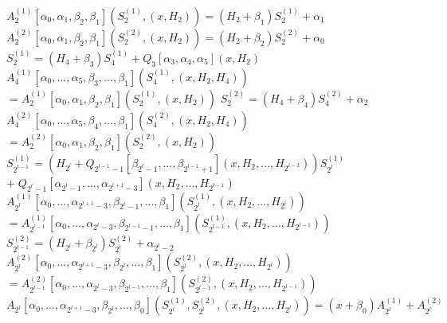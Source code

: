 \begin{algorithm}[H]
    \caption{High-level fill construction}\label{alg:constr-fill}
    \begin{algorithmic}
            \Statex $A^{(1)}_{2}[\alpha_0, \alpha_1, \beta_2, \beta_1](S^{(1)}_2, (x, H_2)) = (H_2 + \beta_1) S^{(1)}_2 + \alpha_1$
            \Statex $A^{(2)}_{2}[\alpha_0, \alpha_1, \beta_2, \beta_1](S^{(2)}_2, (x, H_2)) = (H_2 + \beta_2) S^{(2)}_2 + \alpha_0$
            \Statex $S^{(1)}_{2} = (H_{4} + \beta_3) S^{(1)}_{4} + Q_{3}[\alpha_3, \alpha_4, \alpha_5](x, H_2)$
            \Statex $A^{(1)}_{4}[\alpha_0, \ldots, \alpha_5, \beta_3, \ldots, \beta_1](S^{(1)}_{4}, (x, H_2, H_4))$
            \Statex \hspace{\algorithmicindent}$= A^{(1)}_{2}[\alpha_0, \alpha_1, \beta_2, \beta_1](S^{(1)}_{2}, (x, H_2))$
            \Statex $S^{(2)}_{2} = (H_{4} + \beta_4) S^{(2)}_{4} + \alpha_2$
            \Statex $A^{(2)}_{4}[\alpha_0, \ldots, \alpha_5, \beta_4, \ldots, \beta_1](S^{(2)}_{4}, (x, H_2, H_{4}))$
            \Statex \hspace{\algorithmicindent}$= A^{(2)}_{2}[\alpha_0, \alpha_1, \beta_2, \beta_1](S^{(2)}_{2}, (x, H_2))$
        \Else
            \Statex $S^{(1)}_{2^{l - 1}} = (H_{2^{l}} + Q_{2^{l - 1} - 1}[\beta_{2^{l} - 1}, \ldots, \beta_{2^{l - 1} + 1}](x, H_2, \ldots, H_{2^{l - 2}})) S^{(1)}_{2^l}$
            \Statex \hspace{\algorithmicindent}$+\; Q_{2^{l} - 1}[\alpha_{2^{l} - 1}, \ldots, \alpha_{2^{l + 1} - 3}](x, H_2, \ldots, H_{2^{l - 1}})$
            \Statex $A^{(1)}_{2^l}[\alpha_0, \ldots, \alpha_{2^{l + 1} - 3}, \beta_{2^l - 1}, \ldots, \beta_{1}](S^{(1)}_{2^l}, (x, H_2, \ldots, H_{2^{l}}))$
            \Statex \hspace{\algorithmicindent}$= A^{(1)}_{2^{l - 1}}[\alpha_0, \ldots, \alpha_{2^l - 3}, \beta_{2^{l - 1} - 1}, \ldots, \beta_{1}](S^{(1)}_{2^{l - 1}}, (x, H_2, \ldots, H_{2^{l - 1}}))$
            \Statex $S^{(2)}_{2^{l - 1}} = (H_{2^{l}} + \beta_{2^{l}}) S^{(2)}_{2^l} + \alpha_{2^l - 2}$
            \Statex $A^{(2)}_{2^l}[\alpha_0, \ldots, \alpha_{2^{l + 1} - 3}, \beta_{2^l}, \ldots, \beta_{1}](S^{(2)}_{2^l}, (x, H_2, \ldots, H_{2^{l}}))$
            \Statex \hspace{\algorithmicindent}$= A^{(2)}_{2^{l - 1}}[\alpha_0, \ldots, \alpha_{2^l - 3}, \beta_{2^{l - 1}}, \ldots, \beta_{1}](S^{(2)}_{2^{l - 1}}, (x, H_2, \ldots, H_{2^{l - 1}}))$
        \EndIf
        \Statex $A_{2^l}[\alpha_0, \ldots, \alpha_{2^{l + 1} - 3}, \beta_{2^l}, \ldots, \beta_{0}](S^{(1)}_{2^l}, S^{(2)}_{2^l}, (x, H_2, \ldots, H_{2^{l}})) = (x + \beta_{0}) A^{(1)}_{2^l} + A^{(2)}_{2^l}$
    \end{algorithmic}
\end{algorithm}

